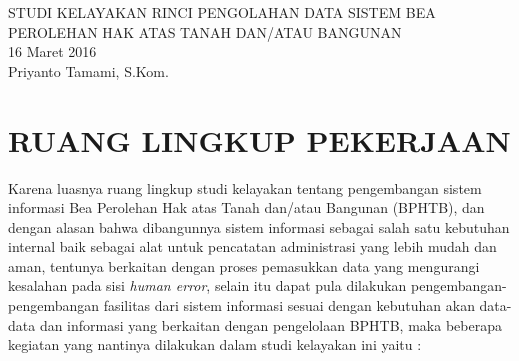 \documentclass[pdftex,12pt, oneside]{article}
\begin{document}
\sloppy %

%
\begin{center}
{\large STUDI KELAYAKAN RINCI PENGOLAHAN DATA SISTEM BEA PEROLEHAN HAK ATAS TANAH DAN/ATAU BANGUNAN}
\\[1cm]
16 Maret 2016\\
Priyanto Tamami, S.Kom.
\end{center}


%
%

% 


%
%
%
%

%
%
%
% 
% 
% 

%
%


\section{RUANG LINGKUP PEKERJAAN}

Karena luasnya ruang lingkup studi kelayakan tentang pengembangan sistem informasi Bea Perolehan Hak atas Tanah dan/atau Bangunan (BPHTB), dan dengan alasan bahwa dibangunnya sistem informasi sebagai salah satu kebutuhan internal baik sebagai alat untuk pencatatan administrasi yang lebih mudah dan aman, tentunya berkaitan dengan proses pemasukkan data yang mengurangi kesalahan pada sisi \textit{human error}, selain itu dapat pula dilakukan pengembangan-pengembangan fasilitas dari sistem informasi sesuai dengan kebutuhan akan data-data dan informasi yang berkaitan dengan pengelolaan BPHTB, maka beberapa kegiatan yang nantinya dilakukan dalam studi kelayakan ini yaitu :
\end{document}
